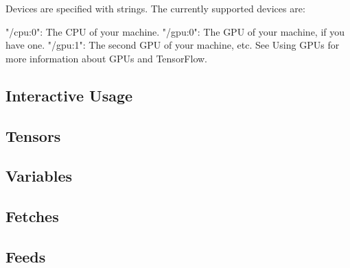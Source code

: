 \documentclass[a4paper,11pt,twoside]{ctexbook}
\begin{document}
Devices are specified with strings. The currently supported devices are:

"/cpu:0": The CPU of your machine.
"/gpu:0": The GPU of your machine, if you have one.
"/gpu:1": The second GPU of your machine, etc.
See Using GPUs for more information about GPUs and TensorFlow.

\subsection{Interactive Usage}

\subsection{Tensors}
\subsection{Variables}
\subsection{Fetches}
\subsection{Feeds}

\begin{lstlisting}
\end{lstlisting}

\begin{lstlisting}
\end{lstlisting}

\begin{lstlisting}
\end{lstlisting}

\begin{lstlisting}
\end{lstlisting}



\newpage






\end{document}
